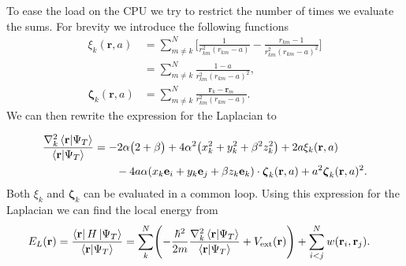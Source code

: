 \documentclass[
    a4paper, aps, twocolumn, floatfix, superscriptaddress]{revtex4-1}
\newcommand{\vf}{\mathbf}
\newcommand{\vfg}{\boldsymbol}
\newcommand{\1}{\mathds{1}}
\begin{document}
            To ease the load on the CPU we try to restrict the number of times
            we evaluate the sums. For brevity we introduce the following
            functions
            \begin{align}
                \xi_k(\vf{r}, a)
                &= \sum_{m \neq k}^N
                \Biggl[
                    \frac{1}{r_{km}^2(r_{km} - a)}
                    - \frac{r_{km} - 1}{r_{km}^2(r_{km} - a)^2}
                \Biggr] \\
                &=
                \sum_{m \neq k}^N
                \frac{1 - a}{r_{km}^2(r_{km} - a)^2}, \\
                \vfg{\zeta}_k(\vf{r}, a)
                &=
                \sum_{m \neq k}^N
                \frac{\vf{r}_k - \vf{r}_m}{r_{km}^2(r_{km} - a)}.
            \end{align}
            We can then rewrite the expression for the Laplacian to
            \begin{widetext}
                \begin{align}
                    \frac{\nabla_k^2\bra{\vf{r}}\ket{\Psi_T}}
                    {\bra{\vf{r}}\ket{\Psi_T}}
                    &=
                    -2\alpha
                    \big(
                        2 + \beta
                    \bigr)
                    + 4\alpha^2
                    \bigl(
                        x_k^2 + y_k^2 + \beta^2z_k^2
                    \bigr)
                    +
                    2a\xi_k(\vf{r}, a)
                    \nonumber \\
                    &\qquad
                    -4a\alpha(x_k\vf{e}_i + y_k\vf{e}_j + \beta z_k\vf{e}_k)
                    \cdot
                    \vfg{\zeta}_k(\vf{r}, a)
                    + a^2\vfg{\zeta}_k(\vf{r}, a)^2.
                \end{align}
                Both $\xi_k$ and $\vfg{\zeta}_k$ can be evaluated in a common
                loop. Using this expression for the Laplacian we can find the
                local energy from
                \begin{align}
                    E_L(\vf{r})
                    &=
                    \frac{\bra{\vf{r}}H\ket{\Psi_T}}
                    {\bra{\vf{r}}\ket{\Psi_T}}
                    =
                    \sum_{k}^N
                    \Biggl(
                        -\frac{\hbar^2}{2m}
                        \frac{\nabla_k^2\bra{\vf{r}}\ket{\Psi_T}}
                        {\bra{\vf{r}}\ket{\Psi_T}}
                        + V_{\text{ext}}(\vf{r})
                    \Biggr)
                    +
                    \sum_{i < j}^N w(\vf{r}_i, \vf{r}_j).
                \end{align}
            \end{widetext}
\end{document}
